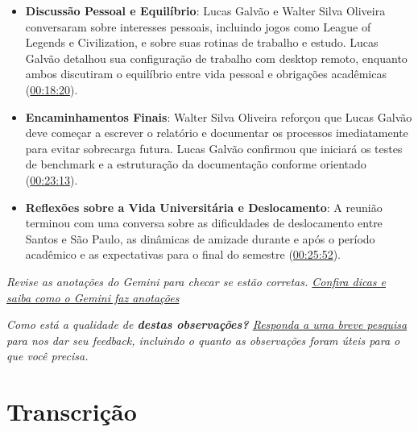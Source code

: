 \begin{itemize}
\item \textbf{Discussão Pessoal e Equilíbrio}: Lucas Galvão e Walter Silva Oliveira conversaram sobre interesses pessoais, incluindo jogos como League of Legends e Civilization, e sobre suas rotinas de trabalho e estudo. Lucas Galvão detalhou sua configuração de trabalho com desktop remoto, enquanto ambos discutiram o equilíbrio entre vida pessoal e obrigações acadêmicas (\href{\#00:18:20}{00:18:20}).
\end{itemize}

\begin{itemize}
\item \textbf{Encaminhamentos Finais}: Walter Silva Oliveira reforçou que Lucas Galvão deve começar a escrever o relatório e documentar os processos imediatamente para evitar sobrecarga futura. Lucas Galvão confirmou que iniciará os testes de benchmark e a estruturação da documentação conforme orientado (\href{\#00:23:13}{00:23:13}).
\end{itemize}

\begin{itemize}
\item \textbf{Reflexões sobre a Vida Universitária e Deslocamento}: A reunião terminou com uma conversa sobre as dificuldades de deslocamento entre Santos e São Paulo, as dinâmicas de amizade durante e após o período acadêmico e as expectativas para o final do semestre (\href{\#00:25:52}{00:25:52}).
\end{itemize}


\emph{Revise as anotações do Gemini para checar se estão corretas. \href{https://support.google.com/meet/answer/14754931}{Confira dicas e saiba como o Gemini faz anotações}}



\emph{Como está a qualidade de \textbf{destas observações?} \href{https://google.qualtrics.com/jfe/form/SV_5bXzKQfylMIhSXc?confid=n3lUFOLoZPItvxYQB_PrDxIWOBABMgUIigIgABgFCA&detailLevel=standard&hasImages=False&entryPoint=footerMain&isGoogler=False}{Responda a uma breve pesquisa} para nos dar seu feedback, incluindo o quanto as observações foram úteis para o que você precisa.}



\chapter{\textbf{ Transcrição}}



